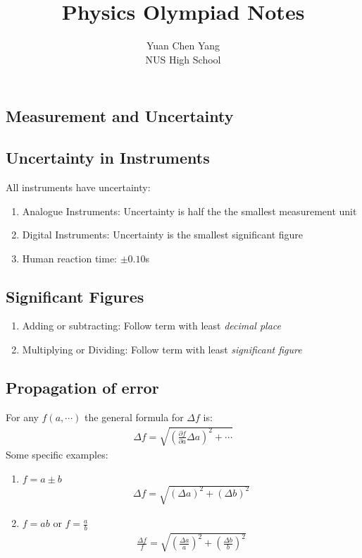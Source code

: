 \documentclass[11pt]{article}
\title{Physics Olympiad Notes}
\author{Yuan Chen Yang\\NUS High School}
\begin{document}
\maketitle
\thispagestyle{empty} %
\pagestyle{empty}

\begin{multicols*}{3}
\section{Measurement and Uncertainty}
\subsection{Uncertainty in Instruments}
All instruments have uncertainty:
\begin{enumerate}
\item Analogue Instruments: Uncertainty is half the the smallest measurement unit
\item Digital Instruments: Uncertainty is the smallest significant figure
\item Human reaction time: $\pm 0.10$s
\end{enumerate}
\subsection{Significant Figures}
\begin{enumerate}
\item Adding or subtracting: Follow term with least {\em decimal place}
\item Multiplying or Dividing: Follow term with least {\em significant figure}
\end{enumerate}
\subsection{Propagation of error}
For any $f(a, \cdots)$ the general formula for $\Delta f$ is:
	\begin{align*}
	\Delta f = \sqrt{\left( \frac{\partial f}{\partial a} \Delta a \right)^2 + \cdots}
	\end{align*}
Some specific examples:
\begin{enumerate}
\item $f=a\pm b$
	\begin{align*}
	\Delta f = \sqrt{(\Delta a)^2+(\Delta b)^2}
	\end{align*}
\item $f=ab$ or $f=\frac{a}{b}$
	\begin{align*}
	\frac{\Delta f}{f} = \sqrt{\left(\frac{\Delta a}{a} \right)^2+\left(\frac{\Delta b}{b} \right)^2}
	\end{align*}
\end{enumerate}

\end{multicols*}
\end{document}
